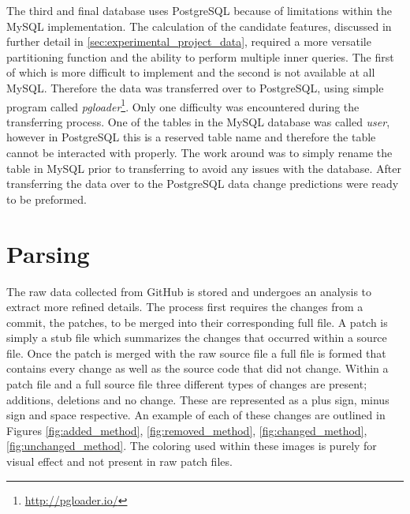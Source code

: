 The third and final database uses PostgreSQL because of limitations within the MySQL implementation. The calculation of the candidate features, discussed in further detail in \autoref{sec:experimental_project_data}, required a more versatile partitioning function and the ability to perform multiple inner queries. The first of which is more difficult to implement and the second is not available at all MySQL. Therefore the data was transferred over to PostgreSQL, using simple program called \textit{pgloader}\footnote{\url{http://pgloader.io/}}. Only one difficulty was encountered during the transferring process. One of the tables in the MySQL database was called \textit{user}, however in PostgreSQL this is a reserved table name and therefore the table cannot be interacted with properly. The work around was to simply rename the table in MySQL prior to transferring to avoid any issues with the database. After transferring the data over to the PostgreSQL data change predictions were ready to be preformed.

\section{Parsing}
\label{sec:parsing}

The raw data collected from GitHub is stored and undergoes an analysis to extract more refined details. The process first requires the changes from a commit, the patches, to be merged into their corresponding full file. A patch is simply a stub file which summarizes the changes that occurred within a source file. Once the patch is merged with the raw source file a full file is formed that contains every change as well as the source code that did not change. Within a patch file and a full source file three different types of changes are present; additions, deletions and no change. These are represented as a plus sign, minus sign and space respective. An example of each of these changes are outlined in Figures \ref{fig:added_method}, \ref{fig:removed_method}, \ref{fig:changed_method}, \ref{fig:unchanged_method}. The coloring used within these images is purely for visual effect and not present in raw patch files.

